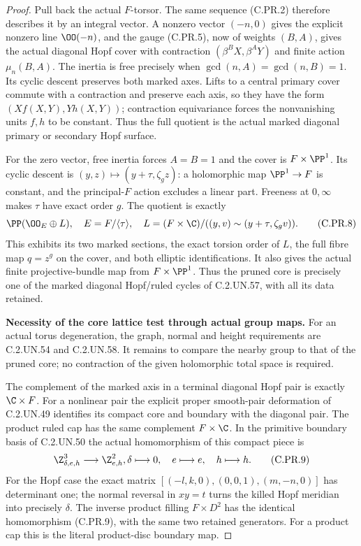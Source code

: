 \begin{proof}
Pull back the actual $F$-torsor. The same sequence (C.PR.2)
therefore describes it by an integral vector. A nonzero vector
$(-n,0)$ gives the explicit nonzero line $\OO(-n)$, and the
gauge (C.PR.5), now of weights $(B,A)$, gives the actual diagonal
Hopf cover with contraction $(\beta^BX,\beta^AY)$ and finite
action $\mu_n(B,A)$. The inertia is free precisely when
$\gcd(n,A)=\gcd(n,B)=1$. Its cyclic descent preserves both
marked axes. Lifts to a central primary cover commute with a
contraction and preserve each axis, so they have the form
$(Xf(X,Y),Yh(X,Y))$; contraction equivariance forces the
nonvanishing units $f,h$ to be constant. Thus the full quotient
is the actual marked diagonal primary or secondary Hopf surface.

For the zero vector, free inertia forces $A=B=1$ and the cover
is $F\times\PP^1$. Its cyclic descent is
$(y,z)\mapsto(y+\tau,\zeta_g z)$: a holomorphic map
$\PP^1\to F$ is constant, and the principal-$F$ action excludes
a linear part. Freeness at $0,\infty$ makes $\tau$ have exact
order $g$. The quotient is exactly
\[
        \PP(\OO_E\oplus L),\quad
        E=F/\langle\tau\rangle,\quad
        L=(F\times\C)/((y,v)\sim(y+\tau,\zeta_gv)).
                                                        \tag{C.PR.8}
\]
This exhibits its two marked sections, the exact torsion order
of $L$, the full fibre map $q=z^g$ on the cover, and both
elliptic identifications. It also gives the actual finite
projective-bundle map from $F\times\PP^1$.
Thus the pruned core is precisely one of the marked diagonal
Hopf/ruled cycles of C.2.UN.57, with all its data retained.

\par\medskip\noindent\textbf{Necessity of the core lattice test through actual group maps.}
For an actual torus degeneration, the graph, normal and height
requirements are C.2.UN.54 and C.2.UN.58. It remains to compare
the nearby group to that of the pruned core; no contraction of
the given holomorphic total space is required.

The complement of the marked axis in a terminal diagonal Hopf
pair is exactly $\C\times F$. For a nonlinear pair the explicit
proper smooth-pair deformation of C.2.UN.49 identifies its compact
core and boundary with the diagonal pair. The product ruled cap
has the same complement $F\times\C$. In the primitive boundary
basis of C.2.UN.50 the actual homomorphism of this compact
piece is
\[
        \Z^3_{\delta,e,h}\longrightarrow\Z^2_{e,h},
                  \delta\longmapsto0,\quad
                  e\longmapsto e,\quad h\longmapsto h. \tag{C.PR.9}
\]
For the Hopf case the exact matrix
$[(-l,k,0),(0,0,1),(m,-n,0)]$ has determinant one;
the normal reversal in $xy=t$ turns the killed Hopf meridian
into precisely $\delta$. The inverse product filling
$F\times D^2$ has the identical homomorphism (C.PR.9),
with the same two retained generators. For a product cap this
is the literal product-disc boundary map.


\end{proof}
